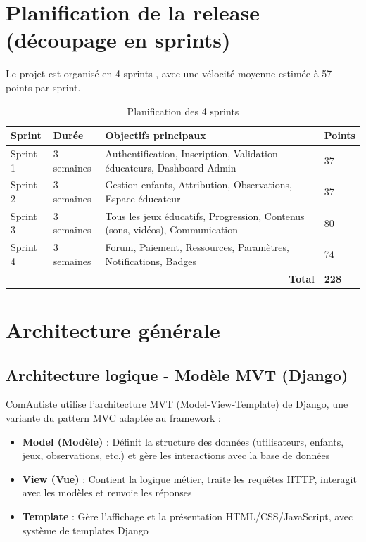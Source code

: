 \documentclass[12pt,a4paper]{report}
\begin{document}
\section{Planification de la release (découpage en sprints)}

Le projet est organisé en 4 sprints , avec une vélocité moyenne estimée à 57 points par sprint.

\begin{table}[h]
\centering
\begin{tabular}{|p{2cm}|p{3cm}|p{8cm}|p{1.5cm}|}
\hline
\textbf{Sprint} & \textbf{Durée} & \textbf{Objectifs principaux} & \textbf{Points} \\
\hline
Sprint 1 & 3 semaines & Authentification, Inscription, Validation éducateurs, Dashboard Admin & 37 \\
\hline
Sprint 2 & 3 semaines & Gestion enfants, Attribution, Observations, Espace éducateur & 37 \\
\hline
Sprint 3 & 3 semaines & Tous les jeux éducatifs, Progression, Contenus (sons, vidéos), Communication & 80 \\
\hline
Sprint 4 & 3 semaines & Forum, Paiement, Ressources, Paramètres, Notifications, Badges & 74 \\
\hline
\multicolumn{3}{|r|}{\textbf{Total}} & \textbf{228} \\
\hline
\end{tabular}
\caption{Planification des 4 sprints}
\end{table}

\section{Architecture générale}

\subsection{Architecture logique - Modèle MVT (Django)}

ComAutiste utilise l'architecture MVT (Model-View-Template) de Django, une variante du pattern MVC adaptée au framework :

\begin{itemize}
    \item \textbf{Model (Modèle)} : Définit la structure des données (utilisateurs, enfants, jeux, observations, etc.) et gère les interactions avec la base de données
    \item \textbf{View (Vue)} : Contient la logique métier, traite les requêtes HTTP, interagit avec les modèles et renvoie les réponses
    \item \textbf{Template} : Gère l'affichage et la présentation HTML/CSS/JavaScript, avec système de templates Django
\end{itemize}
\end{document}
